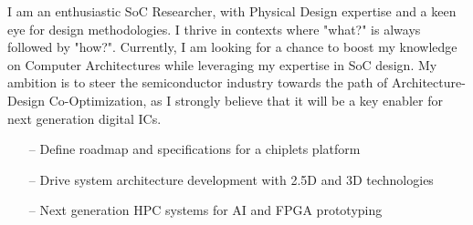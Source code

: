 \documentclass[10pt,a4paper,fancychapters]{altacv}
\begin{document}
%

\begin{fullwidth}
\makecvheader
{}
\justify 
\small{I am an enthusiastic SoC Researcher, with Physical Design expertise and a keen eye for design methodologies. I thrive in contexts where "what?" is always followed by "how?". Currently, I am looking for a chance to boost my knowledge on Computer Architectures while leveraging my expertise in SoC design. My ambition is to steer the semiconductor industry towards the path of  Architecture-Design Co-Optimization, as I strongly believe that it will be a key enabler for next generation digital ICs.}
\end{fullwidth}

%



\begin{itemize}
    \setlength{\itemindent}{0.5em}
    \item[--] \small{Define roadmap and specifications for a chiplets platform}
\end{itemize}


\setlength{\itemindent}{0.5em}
\begin{itemize}
    \item[--] \small{Drive system architecture development with 2.5D and 3D technologies}
    \item[--] \small{Next generation HPC systems for AI and FPGA prototyping}
\end{itemize}
\end{document}
